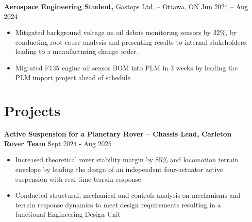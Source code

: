 \documentclass[11pt]{article}       %
\newcommand{\ph}[1]{{\color{red}[#1]}}
\begin{document}
\textbf{Aerospace Engineering Student,} Gastops Ltd. -- Ottawa, ON \hfill Jun 2024 -- Aug 2024 \\
\vspace{-9pt}
\begin{itemize}
  \item Mitigated background voltage on oil debris monitoring sensors by 32\%, by conducting root cause analysis and presenting results to internal stakeholders, leading to a manufacturing change order.
  \item Migrated F135 engine oil sensor BOM into PLM in 3 weeks by leading the PLM import project ahead of schedule
\end{itemize}
 
\vspace{-18.5pt}
 
\section*{Projects}
\textbf{Active Suspension for a Planetary Rover -- Chassis Lead, Carleton Rover Team} \hfill 
\textf Sept 2024 - Aug 2025 \\
\vspace{-9pt}
\begin{itemize}
  \item Increased theoretical rover stability margin by 85\% and locomotion terrain envelope by leading the design of an independent four-actuator active suspension with real-time terrain response
  \item Conducted structural, mechanical and controls analysis on mechanisms and terrain response dynamics to meet design requirements resulting in a functional Engineering Design Unit 
\end{itemize}
 
\end{document}
